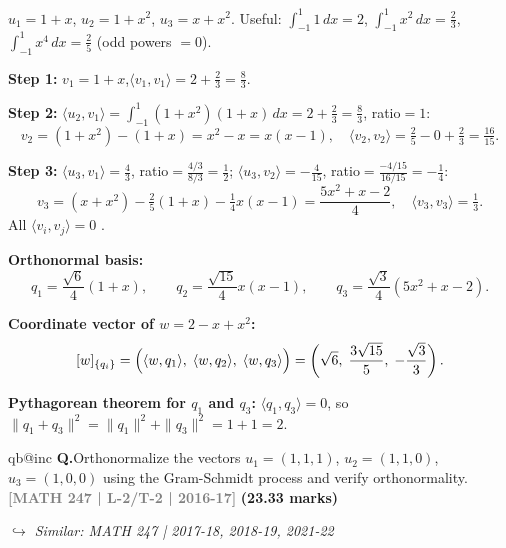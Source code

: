 \documentclass[12pt,a3paper]{article}
\makeatletter
\newcommand{\yr}[1]{\hfill\textcolor{gray}{\small\textbf{[#1]}}}
\newcommand{\mk}[1]{\textcolor{orange!70!black}{\small\textbf{(#1 marks)}}}
\newcommand{\variant}[1]{\par\vspace{1pt}\textcolor{blue!50!black}%
  {\footnotesize\textit{$\hookrightarrow$ Similar: #1}}}
\newcounter{qnum}
\newcommand{\Q}[1]{%
  \csname qb@inc\endcsname
  \needspace{4\baselineskip}
  \refstepcounter{qnum}
  \vspace{6pt}
  \noindent\textbf{Q\theqnum.}\enspace #1\par
}
\makeatother
\begin{document}
\begin{tcolorbox}[enhanced,breakable,
  colback=cD!4,colframe=cD,boxrule=0.8pt,arc=5pt,
  title={\textbf{Answer --- Gram-Schmidt on $P_2$, Inner Product $\langle u,v\rangle=\int_{-1}^{1}uv\,dx$}},
  fonttitle=\bfseries\color{white},colbacktitle=cD]

$u_1=1+x$, $u_2=1+x^2$, $u_3=x+x^2$.\quad
Useful: $\int_{-1}^1 1\,dx=2$, $\int_{-1}^1 x^2\,dx=\tfrac{2}{3}$, $\int_{-1}^1 x^4\,dx=\tfrac{2}{5}$ (odd powers $=0$).

\textbf{Step 1:} $v_1=1+x$,\quad $\langle v_1,v_1\rangle=2+\tfrac{2}{3}=\tfrac{8}{3}$.

\textbf{Step 2:}
$\langle u_2,v_1\rangle=\int_{-1}^1(1+x^2)(1+x)\,dx=2+\tfrac{2}{3}=\tfrac{8}{3}$,\; ratio$=1$:
\[
v_2=(1+x^2)-(1+x)=x^2-x=x(x-1),\quad
\langle v_2,v_2\rangle=\tfrac{2}{5}-0+\tfrac{2}{3}=\tfrac{16}{15}.
\]

\textbf{Step 3:}
$\langle u_3,v_1\rangle=\tfrac{4}{3}$,\; ratio$=\tfrac{4/3}{8/3}=\tfrac{1}{2}$;\quad
$\langle u_3,v_2\rangle=-\tfrac{4}{15}$,\; ratio$=\tfrac{-4/15}{16/15}=-\tfrac{1}{4}$:
\[
v_3=(x+x^2)-\tfrac{2}{5}(1+x)-\tfrac{1}{4}x(x-1)
=\frac{5x^2+x-2}{4},\quad
\langle v_3,v_3\rangle=\tfrac{1}{3}.
\]
All $\langle v_i,v_j\rangle=0$ . \checkmark

\textbf{Orthonormal basis:}
\[
q_1=\frac{\sqrt{6}}{4}(1+x),\qquad
q_2=\frac{\sqrt{15}}{4}x(x-1),\qquad
q_3=\frac{\sqrt{3}}{4}(5x^2+x-2).
\]

\textbf{Coordinate vector of $w=2-x+x^2$:}
\[
[w]_{\{q_i\}}=\Bigl(\langle w,q_1\rangle,\;\langle w,q_2\rangle,\;\langle w,q_3\rangle\Bigr)
=\left(\sqrt{6},\;\frac{3\sqrt{15}}{5},\;-\frac{\sqrt{3}}{3}\right).
\]

\textbf{Pythagorean theorem for $q_1$ and $q_3$:}
$\langle q_1,q_3\rangle=0$, so
$\|q_1+q_3\|^2=\|q_1\|^2+\|q_3\|^2=1+1=2$. \checkmark

\end{tcolorbox}


\Q{Orthonormalize the vectors $u_1 = (1,1,1)$, $u_2 = (1,1,0)$, $u_3 = (1,0,0)$ using the Gram-Schmidt process and verify orthonormality.
\yr{MATH 247 | L-2/T-2 | 2016-17} \mk{23.33}
\variant{MATH 247 | 2017-18, 2018-19, 2021-22}}
\end{document}
